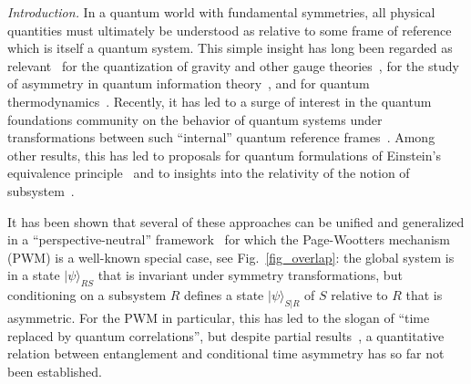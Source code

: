 \documentclass[aps,10pt,twocolumn,showpacs,pra,citeautoscript,amsmath,amssymb,floatfix,superscriptaddress]{revtex4-1}
\begin{document}
\maketitle

\emph{Introduction.} In a quantum world with fundamental symmetries, all physical quantities must ultimately be understood as relative to some frame of reference which is itself a quantum system. This simple insight has long been regarded as relevant~\cite{AharonovSusskind,DeWitt,AharonovKaufherr,Wigner,ArakiYanase} for the quantization of gravity and other gauge theories~\cite{RovelliQG,Thiemann,HenneauxTeitelboim,RovelliRef,RovelliObservable,Isham,Dittrich,Marolf}, for the study of asymmetry in quantum information theory~\cite{BRWS,Marvian,MarvianSpekkens,GourSpekkens,GourMarvianSpekkens,PalmerGirelliBartlett,LoveridgeMiyaderaBusch,Loveridge,SmithPianiMann,Smith,Angelo}, and for quantum thermodynamics~\cite{LostaglioJenningsRudolph,LostaglioKorzekwa,Cwiklinski,Erker,GourJenningsBuscemi}. Recently, it has led to a surge of interest in the quantum foundations community on the behavior of quantum systems under transformations between such ``internal'' quantum reference frames~\cite{Giacomini,HametteGalley,GiacominiSpacetime,Streiter,CastroRuiz,Mikusch,GiacominiSpin,Ballesteros,KrummHoehnMueller,HoehnKrummMueller,Hardy18,ZychBrukner,Hardy19,GBEEP,GB2109,HoehnSubsystem,CastroRuizOreshkov,DGHLM21,HoehnSubsystem,CastroRuizOreshkov,DGHLM21,Vanrietvelde,Vanrietvelde2,HoehnUniverse,Vanrietvelde3,Trinity,HSLRel,DGHLM21,HoehnKrummMueller}. Among other results, this has led to proposals for quantum formulations of Einstein's equivalence principle~\cite{Hardy18,ZychBrukner,Hardy19,GBEEP,GB2109} and to insights into the relativity of the notion of subsystem~\cite{HoehnSubsystem,CastroRuizOreshkov,DGHLM21}.

It has been shown that several of these approaches can be unified and generalized in a ``perspective-neutral'' framework~\cite{HoehnSubsystem,CastroRuizOreshkov,DGHLM21,Vanrietvelde,Vanrietvelde2,HoehnUniverse,Vanrietvelde3,Trinity,HSLRel,DGHLM21,HoehnKrummMueller} for which the Page-Wootters mechanism~\cite{PageWootters83,Wootters84,Giovannetti,Trinity,HSLRel} (PWM) is a well-known special case, see Fig.~\ref{fig_overlap}: the global system is in a state $|\psi\rangle_{RS}$ that is invariant under symmetry transformations, but conditioning on a subsystem $R$ defines a state $|\psi\rangle_{S|R}$ of $S$ relative to $R$ that is asymmetric. For the PWM in particular, this has led to the slogan of ``time replaced by quantum correlations'', but despite partial results~\cite{Mendes,Martinelli,Carmo}, a quantitative relation between entanglement and conditional time asymmetry has so far not been established.
\end{document}

